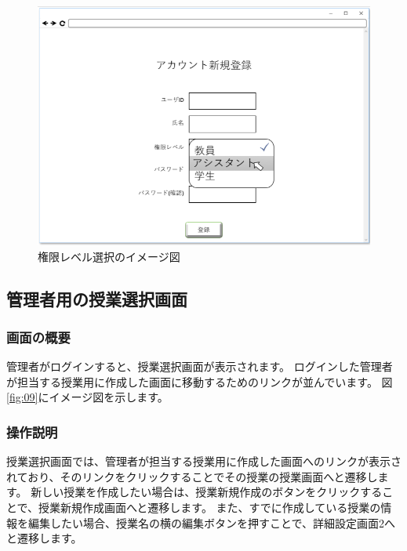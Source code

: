 \begin{figure}[phtbp]
  \begin{center}
    \includegraphics[width=1\linewidth,clip]{./img/08.png}
    \caption{権限レベル選択のイメージ図}\label{fig:08}
  \end{center}
\end{figure}

\newpage

\subsection{管理者用の授業選択画面}
\subsubsection{画面の概要}
管理者がログインすると、授業選択画面が表示されます。
ログインした管理者が担当する授業用に作成した画面に移動するためのリンクが並んでいます。
図\ref{fig:09}にイメージ図を示します。

\subsubsection{操作説明}
授業選択画面では、管理者が担当する授業用に作成した画面へのリンクが表示されており、そのリンクをクリックすることでその授業の授業画面へと遷移します。
新しい授業を作成したい場合は、授業新規作成のボタンをクリックすることで、授業新規作成画面へと遷移します。
また、すでに作成している授業の情報を編集したい場合、授業名の横の編集ボタンを押すことで、詳細設定画面2へと遷移します。

